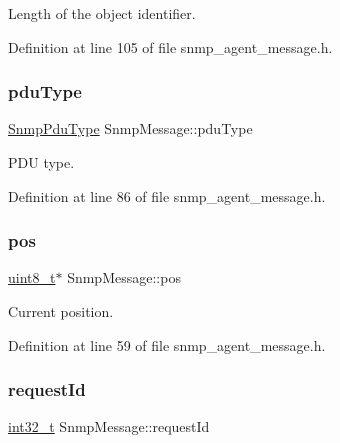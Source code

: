 Length of the object identifier. 



Definition at line 105 of file snmp\+\_\+agent\+\_\+message.\+h.

\mbox{\label{structSnmpMessage_a48ced2a20c11fcd5c72fa1c47d239343}} 
\subsubsection{\texorpdfstring{pdu\+Type}{pduType}}
{\footnotesize\ttfamily \hyperlink{snmp__common_8h_a3c16ad3ed681ee8a30c429d490f9299a}{Snmp\+Pdu\+Type} Snmp\+Message\+::pdu\+Type}



P\+DU type. 



Definition at line 86 of file snmp\+\_\+agent\+\_\+message.\+h.

\mbox{\label{structSnmpMessage_a37d25fb4329d91746ae12b8f1ddb612b}} 
\subsubsection{\texorpdfstring{pos}{pos}}
{\footnotesize\ttfamily \hyperlink{stdint_8h_aba7bc1797add20fe3efdf37ced1182c5}{uint8\+\_\+t}$\ast$ Snmp\+Message\+::pos}



Current position. 



Definition at line 59 of file snmp\+\_\+agent\+\_\+message.\+h.

\mbox{\label{structSnmpMessage_a53c30d2eaaf117a457bfd3211071540b}} 
\subsubsection{\texorpdfstring{request\+Id}{requestId}}
{\footnotesize\ttfamily \hyperlink{stdint_8h_ab1967d8591af1a4e48c37fd2b0f184d0}{int32\+\_\+t} Snmp\+Message\+::request\+Id}




